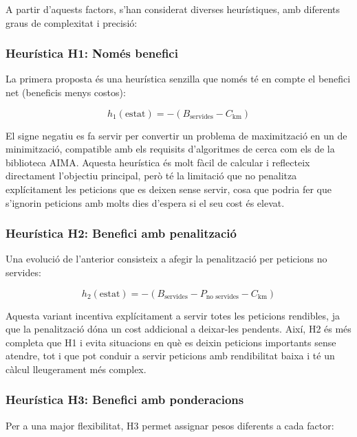 A partir d’aquests factors, s’han considerat diverses heurístiques, amb diferents graus de complexitat i precisió:

\subsubsection{Heurística H1: Només benefici}

La primera proposta és una heurística senzilla que només té en compte el benefici net (beneficis menys costos):

\begin{equation}
h_1(\text{estat}) = -(B_{\text{servides}} - C_{\text{km}})
\end{equation}

El signe negatiu es fa servir per convertir un problema de maximització en un de minimització, compatible amb els requisits d’algoritmes de cerca com els de la biblioteca AIMA. Aquesta heurística és molt fàcil de calcular i reflecteix directament l’objectiu principal, però té la limitació que no penalitza explícitament les peticions que es deixen sense servir, cosa que podria fer que s’ignorin peticions amb molts dies d’espera si el seu cost és elevat.

\subsubsection{Heurística H2: Benefici amb penalització}

Una evolució de l’anterior consisteix a afegir la penalització per peticions no servides:

\begin{equation}
h_2(\text{estat}) = -(B_{\text{servides}} - P_{\text{no servides}} - C_{\text{km}})
\end{equation}

Aquesta variant incentiva explícitament a servir totes les peticions rendibles, ja que la penalització dóna un cost addicional a deixar-les pendents. Així, H2 és més completa que H1 i evita situacions en què es deixin peticions importants sense atendre, tot i que pot conduir a servir peticions amb rendibilitat baixa i té un càlcul lleugerament més complex.

\subsubsection{Heurística H3: Benefici amb ponderacions}

Per a una major flexibilitat, H3 permet assignar pesos diferents a cada factor:

